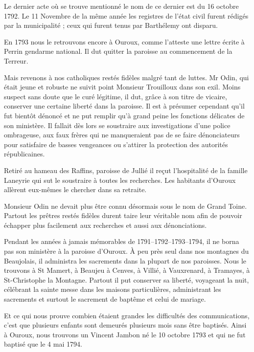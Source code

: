 Le dernier acte où se trouve mentionné le nom de ce dernier est du 16 octobre 1792. Le 11 Novembre de la même année les registres de l'état civil furent rédigés par la municipalité ; ceux qui furent tenus par Barthélemy ont disparu.

En 1793 nous le retrouvons encore à Ouroux, comme l'atteste une lettre écrite à Perrin gendarme national. Il dut quitter la paroisse au commencement de la Terreur.

Mais revenons à nos catholiques restés fidèles malgré tant de luttes. Mr Odin, qui était jeune et robuste ne suivit point Monsieur Trouilloux dans son exil. Moins suspect sans doute que le curé légitime, il dut, grâce à son titre de vicaire, conserver une certaine liberté dans la paroisse. Il est à présumer cependant qu'il fut bientôt dénoncé et ne put remplir qu'à grand peine les fonctions délicates de son ministère. Il fallait dès lors se soustraire aux investigations d'une police ombrageuse, aux faux frères qui ne manqueraient pas de se faire dénonciateurs pour satisfaire de basses vengeances ou s'attirer la protection des autorités républicaines.

Retiré au hameau des Raffins, paroisse de Jullié il reçut l'hospitalité de la famille Laneyrie qui sut le soustraire à toutes les recherches. Les habitants d'Ouroux allèrent eux-mêmes le chercher dans sa retraite.

Monsieur Odin ne devait plus être connu désormais sous le nom de Grand Toine. Partout les prêtres restés fidèles durent taire leur véritable nom afin de pouvoir échapper plus facilement aux recherches et aussi aux dénonciations.

Pendant les années à jamais mémorables de 1791--1792--1793--1794, il ne borna pas son ministère à la paroisse d'Ouroux. À peu près seul dans nos montagnes du Beaujolais, il administra les sacrements dans la plupart de nos paroisses. Nous le trouvons à St Mamert, à Beaujeu à Cenves, à Villié, à Vauxrenard, à Tramayes, à St-Christophe la Montagne. Partout il put conserver sa liberté, voyageant la nuit, célébrant la sainte messe dans les maisons particulières, administrant les sacrements et surtout le sacrement de baptême et celui de mariage.

Et ce qui nous prouve combien étaient grandes les difficultés des communications, c'est que plusieurs enfants sont demeurés plusieurs mois sans être baptisés. Ainsi à Ouroux, nous trouvons un Vincent Jambon né le 10 octobre 1793 et qui ne fut baptisé que le 4 mai 1794.

